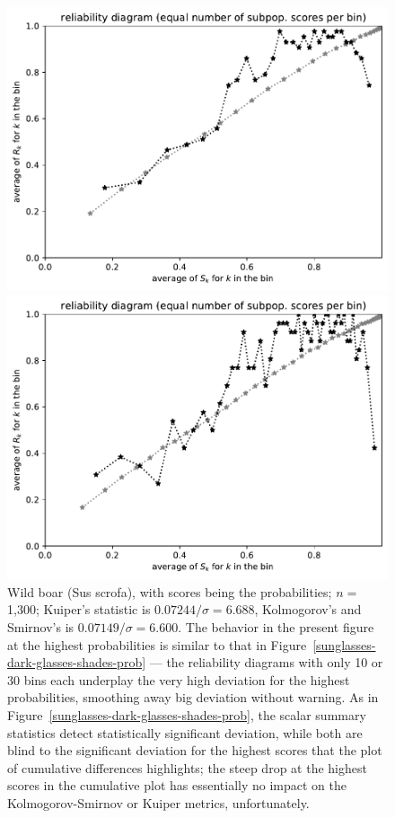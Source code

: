 \documentclass{article}
\begin{document}
\begin{figure}
\begin{centering}
\parbox{\imsize}{\includegraphics[width=\imsize]
       {./codes/unweighted/prob-1-342-wild-boar-boar-Sus-scrofaequisamps30}}
\quad\quad
\parbox{\imsize}{\includegraphics[width=\imsize]
       {./codes/unweighted/prob-1-342-wild-boar-boar-Sus-scrofaequisamps50}}

\end{centering}
\caption{Wild boar (Sus scrofa), with scores being the probabilities;
         $n =$ 1,300; Kuiper's statistic is $0.07244 / \sigma = 6.688$,
         Kolmogorov's and Smirnov's is $0.07149 / \sigma = 6.600$.
The behavior in the present figure at the highest probabilities
is similar to that in Figure~\ref{sunglasses-dark-glasses-shades-prob}
--- the reliability diagrams with only 10 or 30 bins each
underplay the very high deviation for the highest probabilities,
smoothing away big deviation without warning.
As in Figure~\ref{sunglasses-dark-glasses-shades-prob},
the scalar summary statistics detect statistically significant deviation,
while both are blind to the significant deviation for the highest scores
that the plot of cumulative differences highlights;
the steep drop at the highest scores in the cumulative plot
has essentially no impact on the Kolmogorov-Smirnov or Kuiper metrics,
unfortunately.
}
\label{wild-boar-boar-Sus-scrofa-prob}
\end{figure}
\end{document}
